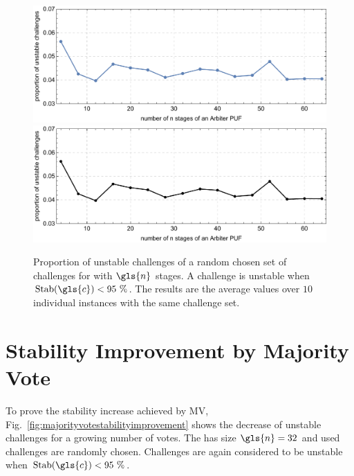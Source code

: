 \vspace{0.25cm}
\begin{figure}[ht]
\ifx{}\undefined
{}
\else
	\if{}
\centering
\includegraphics[width=1.00\textwidth]{images/stages-stab-simulation.pdf}
	\else
\includegraphics[width=1.00\textwidth]{images/stages-stab-simulation_mono.pdf}
    \fi
\fi
\caption[Proportion of unstable challenges of an \apuf]{Proportion of unstable challenges of a random chosen set of challenges for \apufs with $\gls{n}$ stages. 
A challenge is unstable when $\Stab(\gls{c}) < 95\ \%$. 
The results are the average values over $10$ individual \puf instances with the same challenge set.} 
\label{fig:arbiterstabilities}
\end{figure}



\section{Stability Improvement by Majority Vote}
\label{sec:stabilityimprovementbymajorityvote}

To prove the stability increase achieved by \ac{MV}, Fig.\ \ref{fig:majorityvotestabilityimprovement} shows the decrease of unstable challenges for a growing number of votes.
The \mpuf has size $\gls{n} = 32$ and used challenges are randomly chosen.
Challenges are again considered to be unstable when $\Stab(\gls{c}) < 95\ \%$.

